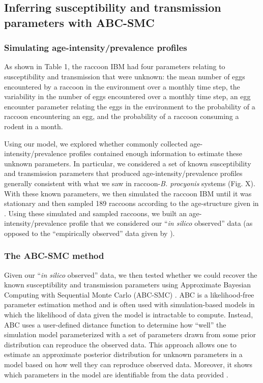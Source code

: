 \documentclass[11pt]{article}
\begin{document}
\subsection{Inferring susceptibility and transmission parameters with ABC-SMC}

\subsubsection{Simulating age-intensity/prevalence profiles}

As shown in Table 1, the raccoon IBM had four parameters relating to susceptibility and transmission that were unknown: 
the mean number of eggs encountered by a raccoon in the environment over
a monthly time step, the variability in the number of eggs encountered
over a monthly time step, an egg encounter parameter relating the eggs
in the environment to the probability of a raccoon encountering an egg, and
the probability of a raccoon consuming a rodent in a month.

Using our model, we explored whether commonly collected age-intensity/prevalence profiles contained enough information to estimate these unknown parameters.  In particular, we considered a set of known susceptibility and transmission parameters that produced age-intensity/prevalence profiles generally consistent with what we saw in raccoon-\emph{B. procyonis} systems (Fig. X).  With these known parameters, we then simulated the raccoon IBM until it was stationary and then sampled 189 raccoons according to the age-structure given in \cite{Weinstein2016}.  Using these simulated and sampled raccoons, we built an age-intensity/prevalence profile that we considered our ``\emph{in silico} observed'' data (as opposed to the ``empirically observed'' data given by \cite{Weinstein2016}).

\subsubsection{The ABC-SMC method}

Given our ``\emph{in silico} observed'' data, we then tested whether we could recover the known susceptibility and transmission parameters using Approximate Bayesian Computing
with Sequential Monte Carlo (ABC-SMC) \citep{Sisson2009,Toni2009,Beaumont2010,Kosmala2015}. ABC is a likelihood-free parameter estimation method and is often used with simulation-based
models in which the likelihood of data given the model is
intractable to compute. Instead, ABC uses a user-defined distance
function to determine how ``well'' the simulation model parameterized
with a set of parameters drawn from some prior distribution can
reproduce the observed data. This approach allows one to estimate an
approximate posterior distribution for unknown parameters in a model based
on how well they can reproduce observed data.  Moreover, it shows which parameters in the model are identifiable  from the data provided \citep{Toni2009}.
\end{document}
